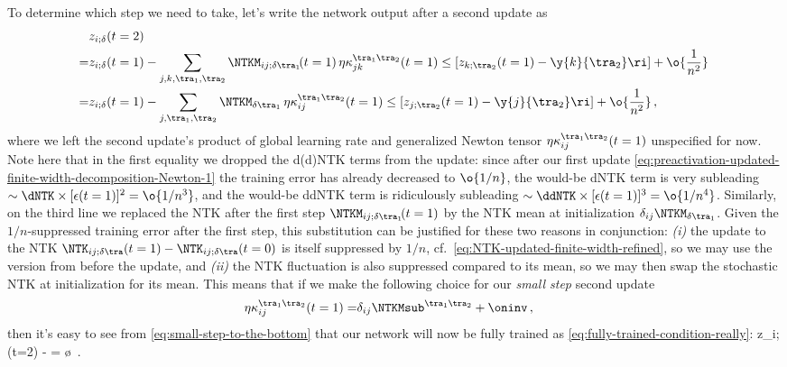 To determine which step we need to take, let's write the network output after a second update as
\begin{align}\label{eq:small-step-to-the-bottom}
&z_{i;\delta}(t=2) \\
=&z_{i;\delta}(t=1)-\sum_{j,k,\tra_1, \tra_2}\NTKM_{i j;\delta\tra_1}\!(t=1) \, \eta\kappa^{\tra_1\tra_2}_{jk}(t=1)   \le[z_{k;\tra_2}(t=1)  -\y{k}{\tra_2}\ri]  + \o{\frac{1}{n^2}}\, \notag \\
=&z_{i;\delta}(t=1)-\sum_{j,\tra_1, \tra_2}\NTKM_{\delta\tra_1} \, \eta\kappa^{\tra_1\tra_2}_{ij}(t=1)   \le[z_{j;\tra_2}(t=1)  -\y{j}{\tra_2}\ri]  + \o{\frac{1}{n^2}}\, , \notag
\end{align}
where we left the second update's product of global learning rate and generalized Newton tensor $\eta \kappa^{\tra_1\tra_2}_{ij}(t=1)$ unspecified for now. Note here that in the first equality we dropped the d(d)NTK terms from the update: since after our first update \eqref{eq:preactivation-updated-finite-width-decomposition-Newton-1} the training error has already decreased to $\o{1/n}$, the would-be dNTK term is very subleading $\sim \dNTK \times [\epsilon(t=1)]^2=\o{1/n^3}$, and
the would-be ddNTK term is ridiculously subleading $\sim \ddNTK \times [\epsilon(t=1)]^3=\o{1/n^4}$. Similarly, on the third line we replaced the NTK after the first step
$\NTKM_{ij;\delta\tra_1}\!(t=1)$ by the NTK mean 
at initialization $\delta_{ij}\NTKM_{\delta\tra_1}$. Given the $1/n$-suppressed training error after the first step, this substitution can be justified for these two reasons in conjunction: \emph{(i)} the update to the NTK  $\NTK_{ij;\delta\tra}(t=1)-\NTK_{ij;\delta\tra}(t=0)$ is itself suppressed by $1/n$, 
cf.~\eqref{eq:NTK-updated-finite-width-refined}, 
so we may use the version from before the update, and \emph{(ii)} the NTK fluctuation is also suppressed compared to its mean, so we may then swap the stochastic NTK at initialization for its mean.
This means that if we make the following choice for our \emph{small step} second update
\begin{align}\label{eq:newton-step-generalized-second}
\eta \kappa^{\tra_1\tra_2}_{ij}(t=1) =& \delta_{ij} \NTKMsub^{\tra_1 \tra_2} + \oninv \, ,
\end{align}
then it's easy to see from  \eqref{eq:small-step-to-the-bottom} that our network will now be fully trained  as \eqref{eq:fully-trained-condition-really}:
\be\label{eq:two-step-twice-reduced-error}
z_{i;\tra}(t=2) -  = \o{}\, .
\ee
